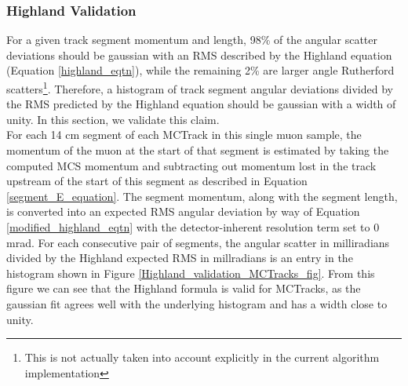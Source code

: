 \subsubsection{Highland Validation}\label{Highland_Validation_MCTrack_section}
For a given track segment momentum and length, 98\% of the angular scatter deviations should be gaussian with an RMS described by the Highland equation (Equation \ref{highland_eqtn}), while the remaining 2\% are larger angle Rutherford scatters\cite{highland}\footnote{This is not actually taken into account explicitly in the current algorithm implementation}. Therefore, a histogram of track segment angular deviations divided by the RMS predicted by the Highland equation should be gaussian with a width of unity. In this section, we validate this claim.\\

For each 14 cm segment of each {\sc MCTrack} in this single muon sample, the momentum of the muon at the start of that segment is estimated by taking the computed MCS momentum and subtracting out momentum lost in the track upstream of the start of this segment as described in Equation \ref{segment_E_equation}. The segment momentum, along with the segment length, is converted into an expected RMS angular deviation by way of Equation \ref{modified_highland_eqtn} with the detector-inherent resolution term set to 0 mrad. For each consecutive pair of segments, the angular scatter in milliradians divided by the Highland expected RMS in millradians is an entry in the histogram shown in Figure \ref{Highland_validation_MCTracks_fig}. From this figure we can see that the Highland formula is valid for {\sc MCTracks}, as the gaussian fit agrees well with the underlying histogram and has a width close to unity.

